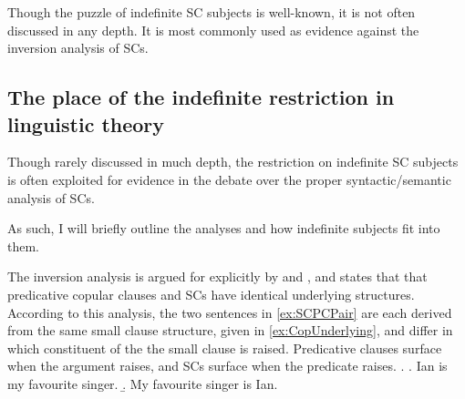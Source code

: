 \documentclass[GPFinal]{subfiles}
\begin{document}
Though the puzzle of indefinite SC subjects is well-known, it is not often discussed in any depth.
It is most commonly used as evidence against the inversion analysis of SCs.
\subsection{The place of the indefinite restriction in linguistic theory}
Though rarely discussed in much depth, the restriction on indefinite SC subjects is often exploited for evidence in the debate over the proper syntactic/semantic analysis of SCs.

As such, I will briefly outline the analyses and how indefinite subjects fit into them.

The inversion analysis is argued for explicitly by \textcite{mikkelsen2004specifying} and \textcite{moro1997raising}, and states that that predicative copular clauses and SCs have identical underlying structures.
According to this analysis, the two sentences in \ref{ex:SCPCPair} are each derived from the same small clause structure, given in \ref{ex:CopUnderlying}, and differ in which constituent of the the small clause is raised.
Predicative clauses surface when the argument raises, and SCs surface when the predicate raises.
\ex.\label{ex:SCPCPair}
\a.\label{ex:SCPCPairPC} Ian is my favourite singer.
\b.\label{ex:SCPCPairSC} My favourite singer is Ian.
\end{document}
